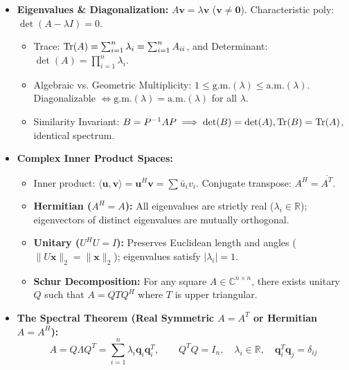 \begin{tcolorbox}[breakable, colback=tealbg!30, colframe=tealborder, title={\large \textbf{2. Spectral Theory, Complex Operators \& Rayleigh Quotient (Weeks 4--5)}}]
\begin{itemize}[leftmargin=*, noitemsep, topsep=2pt]
    \item \textbf{Eigenvalues \& Diagonalization:} $A \mathbf{v} = \lambda \mathbf{v}$ ($\mathbf{v} \ne \mathbf{0}$). Characteristic poly: $\det(A - \lambda I) = 0$.
    \begin{itemize}[leftmargin=*, noitemsep]
        \item Trace: $\operatorname{Tr}(A) = \sum_{i=1}^n \lambda_i = \sum_{i=1}^n A_{ii}$, and Determinant: $\det(A) = \prod_{i=1}^n \lambda_i$.
        \item Algebraic vs. Geometric Multiplicity: $1 \le \text{g.m.}(\lambda) \le \text{a.m.}(\lambda)$. Diagonalizable $\iff \text{g.m.}(\lambda) = \text{a.m.}(\lambda)$ for all $\lambda$.
        \item Similarity Invariant: $B = P^{-1} A P \implies \det(B) = \det(A), \operatorname{Tr}(B) = \operatorname{Tr}(A)$, identical spectrum.
    \end{itemize}
    \item \textbf{Complex Inner Product Spaces:}
    \begin{itemize}[leftmargin=*, noitemsep]
        \item Inner product: $\langle \mathbf{u}, \mathbf{v} \rangle = \mathbf{u}^H \mathbf{v} = \sum \bar{u}_i v_i$. Conjugate transpose: $A^H = \overline{A^T}$.
        \item \textbf{Hermitian ($A^H = A$):} All eigenvalues are strictly real ($\lambda_i \in \mathbb{R}$); eigenvectors of distinct eigenvalues are mutually orthogonal.
        \item \textbf{Unitary ($U^H U = I$):} Preserves Euclidean length and angles ($\|U\mathbf{x}\|_2 = \|\mathbf{x}\|_2$); eigenvalues satisfy $|\lambda_i| = 1$.
        \item \textbf{Schur Decomposition:} For any square $A \in \mathbb{C}^{n \times n}$, there exists unitary $Q$ such that $A = Q T Q^H$ where $T$ is upper triangular.
    \end{itemize}
    \item \textbf{The Spectral Theorem (Real Symmetric $A = A^T$ or Hermitian $A = A^H$):}
    \begin{equation*}
    A = Q \Lambda Q^T = \sum_{i=1}^n \lambda_i \mathbf{q}_i \mathbf{q}_i^T, \qquad Q^T Q = I_n, \quad \lambda_i \in \mathbb{R}, \quad \mathbf{q}_i^T \mathbf{q}_j = \delta_{ij}

\end{equation*}
\end{itemize}
\end{tcolorbox}
